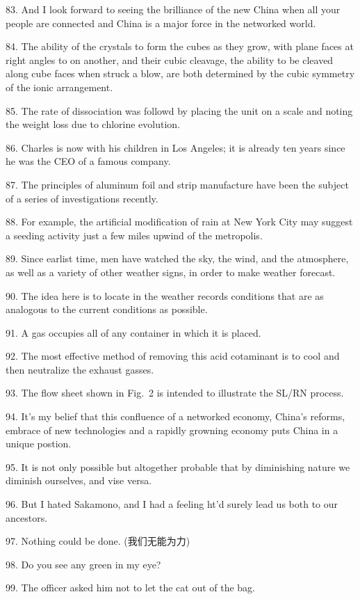 \documentclass[a4paper,twocolumn,10pt]{article}
\begin{document}
\begin{CJK}{UTF8}{gkai}
83. And I look forward to seeing the brilliance of the new China
when all your people are connected and China is a major force in the networked
world.

84. The ability of the crystals to form the cubes as they grow, with plane
faces at right angles to on another, and their cubic cleavage, the ability to
be cleaved along cube faces when struck a blow, are both determined by the
cubic symmetry of the ionic arrangement.

85. The rate of dissociation was followd by placing the unit on a scale and 
noting the weight loss due to chlorine evolution.

86. Charles is now with his children in Los Angeles; it is already
ten years since he was the CEO of a famous company.

87. The principles of aluminum foil and strip manufacture have been
the subject of a series of investigations recently.

88. For example, the artificial modification of rain at New York City
may suggest a seeding activity just a few miles upwind of the metropolis.

89. Since earlist time, men have watched the sky, the wind, and
the atmosphere, as well as a variety of other weather signs, in 
order to make weather forecast.

90. The idea here is to locate in the weather records conditions
that are as analogous to the current conditions as possible.

91. A gas occupies all of any container in which it is placed.

92. The most effective method of removing this acid cotaminant
is to cool and then neutralize the exhaust gasses.

93. The flow sheet shown in Fig.~2 is intended to illustrate the
SL/RN process.

94. It's my belief that this confluence of a networked economy,
China's reforms, embrace of new technologies and a rapidly growning
economy puts China in a unique postion.

95. It is not only possible but altogether probable that by
diminishing nature we diminish ourselves, and vise versa.

96. But I hated Sakamono, and I had a feeling ht'd surely
lead us both to our ancestors.

97. Nothing could be done. (我们无能为力)

98. Do you see any green in my eye?

99. The officer asked him not to let the cat out of the bag.


\end{CJK}
\end{document}
